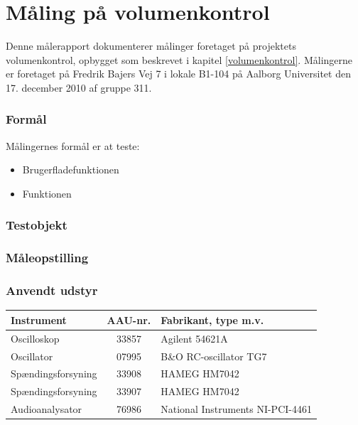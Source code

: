 \chapter{Måling på volumenkontrol}
\label{maalevolumenkontrol}

Denne målerapport dokumenterer målinger foretaget på projektets volumenkontrol, opbygget som beskrevet i kapitel \ref{volumenkontrol}. Målingerne er foretaget på Fredrik Bajers Vej 7 i lokale B1-104 på Aalborg Universitet den 17. december 2010 af gruppe 311.

\subsection*{Formål}
Målingernes formål er at teste:
\begin{itemize}
\item Brugerfladefunktionen
\item Funktionen
\end{itemize}

\subsection*{Testobjekt}


\subsection*{Måleopstilling}


\subsection*{Anvendt udstyr}

\begin{table}[h]
\centering
\begin{tabular}{l|c|l}
\hline\hline
Instrument & AAU-nr. & Fabrikant, type m.v. \\
\hline\hline
Oscilloskop & 33857 & Agilent 54621A \\[4pt]
Oscillator & 07995 & B\&O RC-oscillator TG7 \\[4pt]
Spændingsforsyning & 33908 & HAMEG HM7042 \\[4pt]
Spændingsforsyning & 33907 & HAMEG HM7042 \\[4pt]
Audioanalysator & 76986 & National Instruments NI-PCI-4461 \\
\hline\hline
\end{tabular}
\label{tab:maaleudstyr_forforstaerker}
\end{table}

